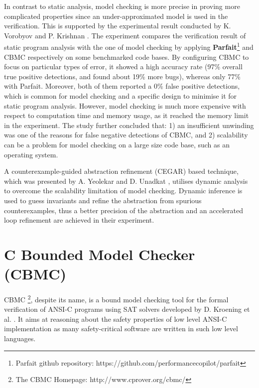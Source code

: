 In contrast to static analysis, model checking is more precise in proving more complicated properties since an under-approximated model is used in the verification. This is supported by the experimental result conducted by K. Vorobyov and P. Krishnan \cite{vorobyov2010comparing}. The experiment compares the verification result of static program analysis with the one of model checking by applying \textbf{Parfait}\footnote{Parfait github repository: https://github.com/performancecopilot/parfait} and CBMC respectively on some benchmarked code bases. By configuring CBMC to focus on particular types of error, it showed a high accuracy rate (97\% overall true positive detections, and found about 19\% more bugs), whereas only 77\% with Parfait. Moreover, both of them reported a 0\% false positive detections, which is common for model checking and a specific design to minimise it for static program analysis. However, model checking is much more expensive with respect to computation time and memory usage, as it reached the memory limit in the experiment. The study further concluded that: 1) an insufficient unwinding was one of the reasons for false negative detections of CBMC, and 2) scalability can be a problem for model checking on a large size code base, such as an operating system.

A counterexample-guided abstraction refinement (CEGAR) based technique, which was presented by A. Yeolekar and D. Unadkat \cite{Yeolekar2013}, utilises dynamic analysis to overcome the scalability limitation of model checking. Dynamic inference is used to guess invariants and refine the abstraction from spurious counterexamples, thus a better precision of the abstraction and an accelerated loop refinement are achieved in their experiment. 




\section{C Bounded Model Checker (CBMC)} \label{sec:cbmc}
CBMC \footnote{The CBMC Homepage: http://www.cprover.org/cbmc/}, despite its name, is a bound model checking tool for the formal verification of ANSI-C programs using SAT solvers developed by D. Kroening et al. \cite{ckl2004}. It aims at reasoning about the safety properties of low level ANSI-C implementation as many safety-critical software are written in such low level languages. 

